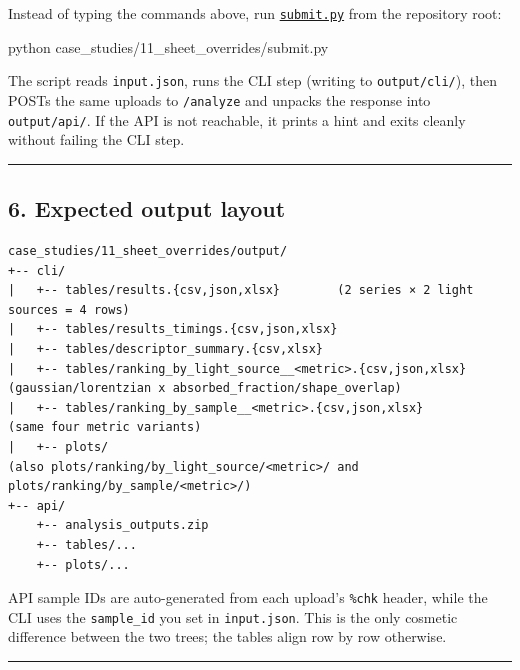 \documentclass[
  11pt,
]{article}
\newenvironment{Shaded}{}{}
\newcommand{\ExtensionTok}[1]{#1}
\newcommand{\NormalTok}[1]{#1}
\begin{document}
Instead of typing the commands above, run
\href{https://github.com/pinarsyt/overlap-calculator/blob/main/case_studies/11_sheet_overrides/submit.py}{\texttt{submit.py}}
from the repository root:

\begin{Shaded}
\begin{Highlighting}[]
\ExtensionTok{python}\NormalTok{ case\_studies/11\_sheet\_overrides/submit.py}
\end{Highlighting}
\end{Shaded}

The script reads \texttt{input.json}, runs the CLI step (writing to
\texttt{output/cli/}), then POSTs the same uploads to \texttt{/analyze}
and unpacks the response into \texttt{output/api/}. If the API is not
reachable, it prints a hint and exits cleanly without failing the CLI
step.

\begin{center}\rule{0.5\linewidth}{0.5pt}\end{center}

\hypertarget{6-expected-output-layout}{
\subsection{6. Expected output layout}\label{6-expected-output-layout}}

\begin{verbatim}
case_studies/11_sheet_overrides/output/
+-- cli/
|   +-- tables/results.{csv,json,xlsx}        (2 series × 2 light sources = 4 rows)
|   +-- tables/results_timings.{csv,json,xlsx}
|   +-- tables/descriptor_summary.{csv,xlsx}
|   +-- tables/ranking_by_light_source__<metric>.{csv,json,xlsx}   (gaussian/lorentzian x absorbed_fraction/shape_overlap)
|   +-- tables/ranking_by_sample__<metric>.{csv,json,xlsx}          (same four metric variants)
|   +-- plots/                                                      (also plots/ranking/by_light_source/<metric>/ and plots/ranking/by_sample/<metric>/)
+-- api/
    +-- analysis_outputs.zip
    +-- tables/...
    +-- plots/...
\end{verbatim}

API sample IDs are auto-generated from each upload's \texttt{\%chk}
header, while the CLI uses the \texttt{sample\_id} you set in
\texttt{input.json}. This is the only cosmetic difference between the
two trees; the tables align row by row otherwise.

\begin{center}\rule{0.5\linewidth}{0.5pt}\end{center}
\end{document}
